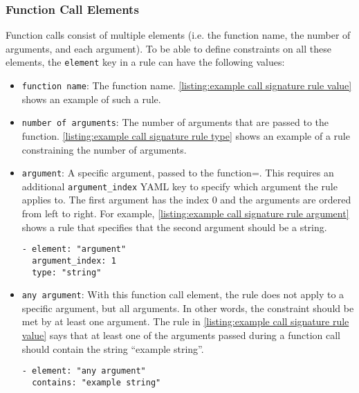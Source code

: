 \subsubsection{Function Call Elements}
Function calls consist of multiple elements (i.e. the function name, the number of arguments, and each argument). To be able to define constraints on all these elements, the \texttt{element} key in a rule can have the following values:
\begin{itemize}
  \item \texttt{function name}: The function name. \autoref{listing:example call signature rule value} shows an example of such a rule.

  \item \texttt{number of arguments}: The number of arguments that are passed to the function. \autoref{listing:example call signature rule type} shows an example of a rule constraining the number of arguments.

  \item \texttt{argument}: A specific argument, passed to the function=. This requires an additional \texttt{argument\_index} YAML key to specify which argument the rule applies to.  The first argument has the index 0 and the arguments are ordered from left to right. For example, \autoref{listing:example call signature rule argument} shows a rule that specifies that the second argument should be a string.

\begin{lstlisting}[label={listing:example call signature rule argument}, caption={An example rule defining a constrains on the second argument.}, captionpos=b]
- element: "argument"
  argument_index: 1
  type: "string"
\end{lstlisting}

  \item \texttt{any argument}: With this function call element, the rule does not apply to a specific argument, but all arguments. In other words, the constraint should be met by at least one argument. The rule in \autoref{listing:example call signature rule value} says that at least one of the arguments passed during a function call should contain the string ``example string''.

\begin{lstlisting}[label={listing:example call signature rule any argument}, caption={An example rule defining a constrains on all arguments.}, captionpos=b]
- element: "any argument"
  contains: "example string"
\end{lstlisting}
\end{itemize}

